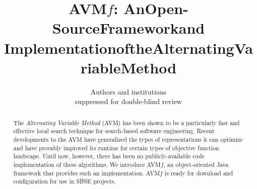 \documentclass{llncs}
\newcommand{\AVM}{Alternating Variable Method\xspace}
\newcommand{\name}{AVM\hspace{-1pt}$f$\xspace}
\begin{document}
\title{\texorpdfstring{\name: An\:Open-Source\:Framework\:and\\$\!$Implementation\:of\:the\:Alternating\:Variable\:Method\vspace{-.5em}}{}}



\author{
		Authors and institutions\\
		suppressed for double-blind review
		\vspace{-1em}
}
\institute{}

\maketitle

\begin{abstract}
The {\it \AVM} (AVM) has been shown to be a particularly fast and effective local search technique for %
search-based software engineering.
%
Recent developments to the AVM have generalized the types of representations it can optimize and have provably improved its runtime for certain types of objective function landscape. Until now, however, there has been no publicly-available code implementation of these algorithms. We introduce \name, an object-oriented Java framework that provides such an implementation. \name is ready for download and configuration for use in SBSE projects.\vspace{-1ex}
\end{abstract}

\vspace{-1em}
\end{document}

